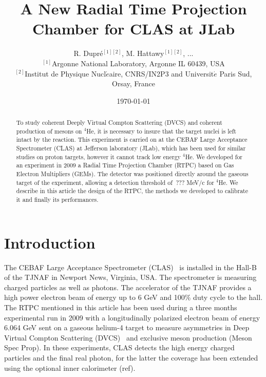 \documentclass[reprint, amsmath,amssymb, aps]{revtex4-1}
\begin{document}

\title{\vspace{-15mm}\fontsize{24pt}{10pt}\selectfont\textbf{A New Radial Time Projection Chamber for CLAS at JLab}}
\author{
\Large{R. Dupr\'e$^{[1][2]}$, M. Hattawy$^{[1][2]}$, ...} \\
\vspace{+5mm}
\normalsize $^{[1]}$Argonne National Laboratory, Argonne IL 60439, USA \\
\normalsize $^{[2]}$Institut de Physique Nucl$\acute{e}$aire, CNRS/IN2P3 and Universit$\acute{e}$ Paris Sud, Orsay, France \\
\vspace{+5mm}
}



\date{\today}%

\begin{abstract}
To study coherent Deeply Virtual Compton Scattering (DVCS) and coherent production of mesons on $^4$He, it is necessary to insure that the target nuclei is left intact by the reaction. This experiment is carried on at the CEBAF Large Acceptance Spectrometer (CLAS) at Jefferson laboratory (JLab), which has been used for similar studies on proton targets, however it cannot track low energy $^4$He. We developed for an experiment in 2009 a Radial Time Projection Chamber (RTPC) based on Gas Electron Multipliers (GEMs). The detector was positioned directly around the gaseous target of the experiment, allowing a detection threshold of $~$??? MeV/c for $^4$He. We describe in this article the design of the RTPC, the methods we developed to calibrate it and finally its performances.
\end{abstract}

\maketitle


\section{\label{sec:level1} Introduction}

The CEBAF Large Acceptance Spectrometer (CLAS)~\cite{CLASref} is installed in the Hall-B of the TJNAF in Newport News, Virginia, USA. The spectrometer is measuring charged particles as well as photons. The accelerator of the TJNAF provides a high power electron beam of energy up to 6 GeV and 100$\%$ duty cycle to the hall. The RTPC mentioned in this article has been used during a three months experimental run in 2009 with a longitudinally polarized electron beam of energy 6.064 GeV sent on a gaseous helium-4 target to measure asymmetries in Deep Virtual Compton Scattering (DVCS)~\cite{proposal} and exclusive meson production (Meson Spec Prop). In these experiments, CLAS detects the high energy charged particles and the final real photon, for the latter the coverage has been extended using the optional inner calorimeter (ref). 
\end{document}
